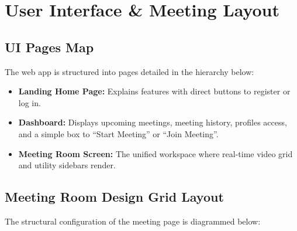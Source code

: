 \documentclass[11pt,a4paper]{article}
\begin{document}
\newpage

\section{User Interface \& Meeting Layout}

\subsection{UI Pages Map}
The web app is structured into pages detailed in the hierarchy below:
\begin{itemize}
    \item \textbf{Landing Home Page:} Explains features with direct buttons to register or log in.
    \item \textbf{Dashboard:} Displays upcoming meetings, meeting history, profiles access, and a simple box to ``Start Meeting'' or ``Join Meeting''.
    \item \textbf{Meeting Room Screen:} The unified workspace where real-time video grid and utility sidebars render.
\end{itemize}

\subsection{Meeting Room Design Grid Layout}
The structural configuration of the meeting page is diagrammed below:
\end{document}
